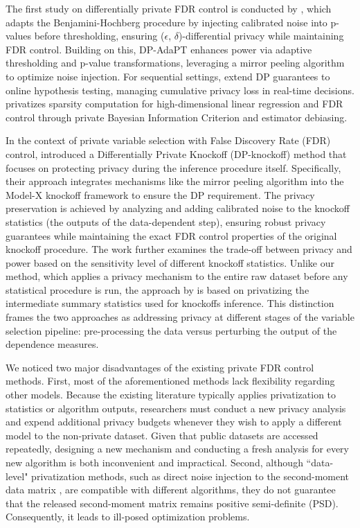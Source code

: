 \documentclass[11pt]{article}
\begin{document}
The first study on differentially private FDR control is conducted by \cite{dwork2021differentially}, which adapts the Benjamini-Hochberg procedure by injecting calibrated noise into p-values before thresholding, ensuring ($\epsilon$, $\delta$)-differential privacy while maintaining FDR control. Building on this, DP-AdaPT \citep{xia2023adaptive} enhances power via adaptive thresholding and p-value transformations, leveraging a mirror peeling algorithm to optimize noise injection. For sequential settings, \cite{zhang2020paprikaprivateonlinefalse} extend DP guarantees to online hypothesis testing, managing cumulative privacy loss in real-time decisions.  \cite{cai2023private} privatizes sparsity computation for high-dimensional linear regression and FDR control through private Bayesian Information Criterion and estimator debiasing. 

In the context of private variable selection with False Discovery Rate (FDR) control, \cite{cai2025knockoffsinferenceprivacyconstraints} introduced a Differentially Private Knockoff (DP-knockoff) method that focuses on protecting privacy during the inference procedure itself. Specifically, their approach integrates mechanisms like the mirror peeling algorithm into the Model-X knockoff framework to ensure the DP requirement. The privacy preservation is achieved by analyzing and adding calibrated noise to the knockoff statistics (the outputs of the data-dependent step), ensuring robust privacy guarantees while maintaining the exact FDR control properties of the original knockoff procedure. The work further examines the trade-off between privacy and power based on the sensitivity level of different knockoff statistics. Unlike our method, which applies a privacy mechanism to the entire raw dataset before any statistical procedure is run, the approach by \cite{cai2025knockoffsinferenceprivacyconstraints} is based on privatizing the intermediate summary statistics used for knockoffs inference. This distinction frames the two approaches as addressing privacy at different stages of the variable selection pipeline: pre-processing the data versus perturbing the output of the dependence measures.

We noticed two major disadvantages of the existing private FDR control methods. First, most of the aforementioned methods lack flexibility regarding other models. Because the existing literature typically applies privatization to statistics or algorithm outputs, researchers must conduct a new privacy analysis and expend additional privacy budgets whenever they wish to apply a different model to the non-private dataset. Given that public datasets are accessed repeatedly, designing a new mechanism and conducting a fresh analysis for every new algorithm is both inconvenient and impractical. Second, although ``data-level" privatization methods, such as direct noise injection to the second-moment data matrix \citep{PournaderiXiang}, are compatible with different algorithms, they do not guarantee that the released second-moment matrix remains positive semi-definite (PSD). Consequently, it leads to ill-posed optimization problems.
\end{document}
